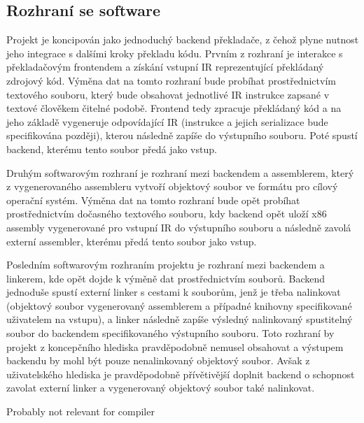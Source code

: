 \documentclass{article}
\def\xxx#1{\textcolor{red!50}{\itshape #1}}
\begin{document}
\subsection{Rozhraní se software}

Projekt je koncipován jako jednoduchý backend překladače, z čehož plyne nutnost jeho integrace s dalšími kroky překladu kódu. Prvním z rozhraní je interakce s překladačovým frontendem a získání vstupní IR reprezentující překládaný zdrojový kód. Výměna dat na tomto rozhraní bude probíhat prostřednictvím textového souboru, který bude obsahovat jednotlivé IR instrukce zapsané v textové člověkem čitelné podobě. Frontend tedy zpracuje překládaný kód a na jeho základě vygeneruje odpovídající IR (instrukce a jejich serializace bude specifikována později), kterou následně zapíše do výstupního souboru. Poté spustí backend, kterému tento soubor předá jako vstup.

Druhým softwarovým rozhraní je rozhraní mezi backendem a assemblerem, který z vygenerovaného assembleru vytvoří objektový soubor ve formátu pro cílový operační systém. Výměna dat na tomto rozhraní bude opět probíhat prostřednictvím dočasného textového souboru, kdy backend opět uloží x86 assembly vygenerované pro vstupní IR do výstupního souboru a následně zavolá externí assembler, kterému předá tento soubor jako vstup.

Posledním softwarovým rozhraním projektu je rozhraní mezi backendem a linkerem, kde opět dojde k výměně dat prostřednictvím souborů. Backend jednoduše spustí externí linker s cestami k souborům, jenž je třeba nalinkovat (objektový soubor vygenerovaný assemblerem a případné knihovny specifikované uživatelem na vstupu), a linker následně zapíše výsledný nalinkovaný spustitelný soubor do backendem specifikovaného výstupního souboru. Toto rozhraní by projekt z koncepčního hlediska pravděpodobně nemusel obsahovat a výstupem backendu by mohl být pouze nenalinkovaný objektový soubor. Avšak z uživatelského hlediska je pravděpodobně přívětivější doplnit backend o schopnost zavolat externí linker a vygenerovaný objektový soubor také nalinkovat.


\iffalse Probably not relevant for compiler
\end{document}
